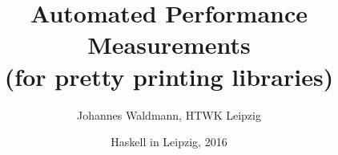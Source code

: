 \documentclass[final,12pt]{beamer}
\title[Automated Performance Measurements]{
  Automated Performance Measurements \\
  (for pretty printing libraries)
}
\author{Johannes Waldmann, 
  HTWK Leipzig
}
\date[HAL'16]{
  Haskell in Leipzig, 2016
}
\begin{document}
\frame{\titlepage}

\newenvironment{slide}[1]%
{\begin{frame}\frametitle{#1}}
{\end{frame}}

% 












% 
\end{document}
